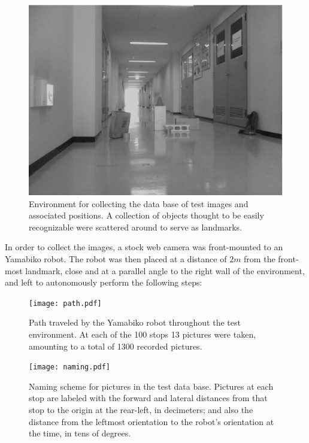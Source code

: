 \documentclass[twocolumn, 9pt]{jsproceedings}
\begin{document}
\begin{figure}[h!]
\includegraphics[width=\columnwidth]{environment.eps}
\caption{Environment for collecting the data base of test images and associated positions. A collection of objects thought to be easily recognizable were scattered around to serve as landmarks.}
\label{fig:environment}
\end{figure}

In order to collect the images, a stock web camera was front-mounted to an Yamabiko robot. The robot was then placed at a distance of \(2m\) from the front-most landmark, close and at a parallel angle to the right wall of the environment, and left to autonomously perform the following steps:

\begin{figure}[h!]
\texttt{[image: path.pdf]}
\caption{Path traveled by the Yamabiko robot throughout the test environment. At each of the 100 stops 13 pictures were taken, amounting to a total of 1300 recorded pictures.}
\label{fig:path}
\end{figure}

\begin{figure}[h!]
\texttt{[image: naming.pdf]}
\caption{Naming scheme for pictures in the test data base. Pictures at each stop are labeled with the forward and lateral distances from that stop to the origin at the rear-left, in decimeters; and also the distance from the leftmost orientation to the robot's orientation at the time, in tens of degrees.}
\label{fig:naming}
\end{figure}
\end{document}
